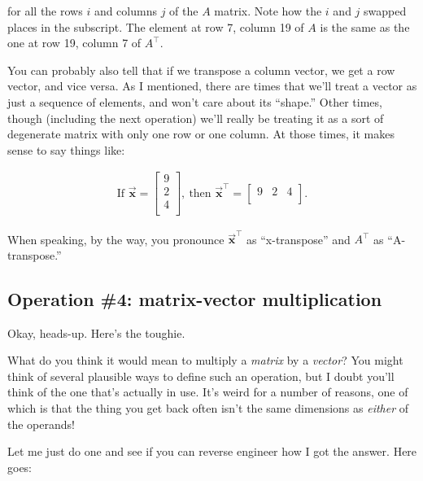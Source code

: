 for all the rows $i$ and columns $j$ of the $A$ matrix. Note how the $i$ and
$j$ swapped places in the subscript. The element at row 7, column 19 of $A$ is
the same as the one at row 19, column 7 of $A^\intercal$.

\smallskip


You can probably also tell that if we transpose a column vector, we get a row
vector, and vice versa. As I mentioned, there are times that we'll treat a
vector as just a sequence of elements, and won't care about its ``shape.''
Other times, though (including the next operation) we'll really be treating it
as a sort of degenerate matrix with only one row or one column. At those times,
it makes sense to say things like:

\vspace{-.15in}
\begin{align*}
\textrm{If } \overrightarrow{\textbf{x}} = 
\begin{bmatrix}
9 \\
2 \\
4 \\
\end{bmatrix},
\ \textrm{then } \overrightarrow{\textbf{x}}^\intercal = 
\begin{bmatrix}
9 & 2 & 4 \\
\end{bmatrix}.
\end{align*}

When speaking, by the way, you pronounce
$\overrightarrow{\textbf{x}}^\intercal$ as ``x-transpose'' and $A^\intercal$ as
``A-transpose.''

\subsection{Operation \#4: matrix-vector multiplication}

Okay, heads-up. Here's the toughie.

What do you think it would mean to multiply a \textit{matrix} by a
\textit{vector}? You might think of several plausible ways to define such an
operation, but I doubt you'll think of the one that's actually in use. It's
weird for a number of reasons, one of which is that the thing you get back
often isn't the same dimensions as \textit{either} of the operands!

Let me just do one and see if you can reverse engineer how I got the answer.
Here goes:

